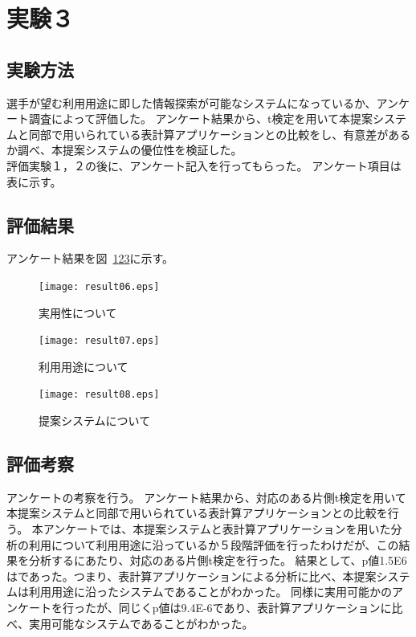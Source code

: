 \documentclass[sotsuron]{kuee}
\begin{document}
	\section{実験３}
		\subsection{実験方法}
			選手が望む利用用途に即した情報探索が可能なシステムになっているか、アンケート調査によって評価した。
			アンケート結果から、t検定を用いて本提案システムと同部で用いられている表計算アプリケーションとの比較をし、有意差があるか調べ、本提案システムの優位性を検証した。
			\\評価実験１，２の後に、アンケート記入を行ってもらった。
			アンケート項目は表に示す。
		\subsection{評価結果}
		アンケート結果を図~\ref{fig:result06}\ref{fig:result07}\ref{fig:result08}に示す。
			\begin{figure}
				\begin{center}
					\texttt{[image: result06.eps]}
				\end{center}
				\caption{実用性について}
		  		\label{fig:result06}
			\end{figure}
			\begin{figure}
				\begin{center}
					\texttt{[image: result07.eps]}
				\end{center}
				\caption{利用用途について}
		  		\label{fig:result07}
			\end{figure}
			\begin{figure}
				\begin{center}
					\texttt{[image: result08.eps]}
				\end{center}
				\caption{提案システムについて}
		  		\label{fig:result08}
			\end{figure}
		\subsection{評価考察}
			アンケートの考察を行う。
			アンケート結果から、対応のある片側t検定を用いて本提案システムと同部で用いられている表計算アプリケーションとの比較を行う。
			本アンケートでは、本提案システムと表計算アプリケーションを用いた分析の利用について利用用途に沿っているか５段階評価を行ったわけだが、この結果を分析するにあたり、対応のある片側t検定を行った。
			結果として、p値1.5E\-6はであった。つまり、表計算アプリケーションによる分析に比べ、本提案システムは利用用途に沿ったシステムであることがわかった。
			同様に実用可能かのアンケートを行ったが、同じくp値は9.4E-6であり、表計算アプリケーションに比べ、実用可能なシステムであることがわかった。
\end{document}
